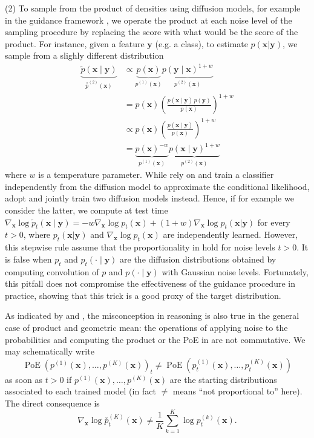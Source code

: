 \documentclass[10pt]{article} %
\newcommand{\engquote}[1]{``#1''}
\DeclareMathOperator{\PoE}{PoE}
\def\rvx{{\mathbf{x}}}
\def\rvy{{\mathbf{y}}}
\newcommand{\geo}[1]{\overset{\circ}{#1}}
\begin{document}
(2)\label{paragraph: composition and noise not commute}
To sample from the product of densities using diffusion models, for example in the guidance framework \citep{dhariwal2021diffusion, ho2022classifier}, we operate the product at each noise level of the sampling procedure by replacing the score with what would be the score of the product.  For instance, given a feature $\rvy$ (e.g. a class), to estimate $p(\rvx|\rvy)$, we sample from a slighly different distribution  \begin{align}
\underbrace{\widetilde{p}(\rvx \mid \rvy)}_{\geo{p}^{(2)}(\rvx)} 
&\propto \underbrace{p(\rvx)}_{p^{(1)}(\rvx)} \underbrace{p(\rvy \mid \rvx)^{1 + w}}_{p^{(2)}(\rvx)} \label{eq: classifier guidance}\\
&= p(\rvx) \left( \frac{p(\rvx \mid \rvy)\, p(\rvy)}{p(\rvx)} \right)^{1 + w} \\
&\propto p(\rvx) \left( \frac{p(\rvx \mid \rvy)}{p(\rvx)} \right)^{1 + w} \\
&= \underbrace{p(\rvx)^{-w}}_{p^{(1)}(\rvx)} \underbrace{p(\rvx \mid \rvy)^{1 + w}}_{p^{(2)}(\rvx)} \label{eq: classifier-free guidance}
\end{align}
 where $w$ is a temperature parameter. While \citet{dhariwal2021diffusion} rely on  and train a classifier independently from the diffusion model to approximate the conditional likelihood, \citet{ho2022classifier} adopt  and jointly train two diffusion models instead. Hence, if for example we consider the latter, we compute at test time $\nabla_\rvx \log \tilde{p}_t(\rvx \mid \rvy) = -w\nabla_\rvx \log p_t(\rvx) 
  + (1+w)\nabla_\rvx \log p_t(\rvx|\rvy)$ for every $t>0$, where $p_t(\rvx|\rvy)$ and $\nabla_\rvx \log p_t(\rvx)$ are independently learned. However, this stepwise rule assume that the proportionality in  hold for noise levels $t > 0$. It is false when $p_t$ and $p_t(\cdot \mid \rvy)$ are the diffusion distributions obtained by computing convolution of $p$ and $p(\cdot \mid \rvy)$ with Gaussian noise levels. Fortunately, this pitfall does not compromise the effectiveness of the guidance procedure in practice, showing that this trick is a good proxy of the target distribution. 
  
  As indicated by \cite{du2023reducereuserecyclecompositional} and \citet{chidambaram2024does}, the misconception in reasoning is also true in the general case of product and geometric mean: the operations of applying noise to the probabilities and computing the product or the PoE in  are not commutative. We may schematically write
\begin{equation}\label{eq: diffused PoE not PoE}
\PoE(p^{(1)}(\rvx),\dots,p^{(K)}(\rvx))_t \neq \PoE(p^{(1)}_t(\rvx),\dots,p^{(K)}_t(\rvx))
\end{equation}
as soon as $t>0$ if $p^{(1)}(\rvx),\dots,p^{(K)}(\rvx)$ are the starting distributions associated to each trained model (in fact $\neq$ means \engquote{not proportional to} here). The direct consequence is
\begin{equation}
\nabla_\rvx \log \geo{p}_t^{(K)} (\rvx) \neq \frac{1}{K} \sum_{k=1}^K \log p^{(k)}_t(\rvx).
\end{equation}
\end{document}
